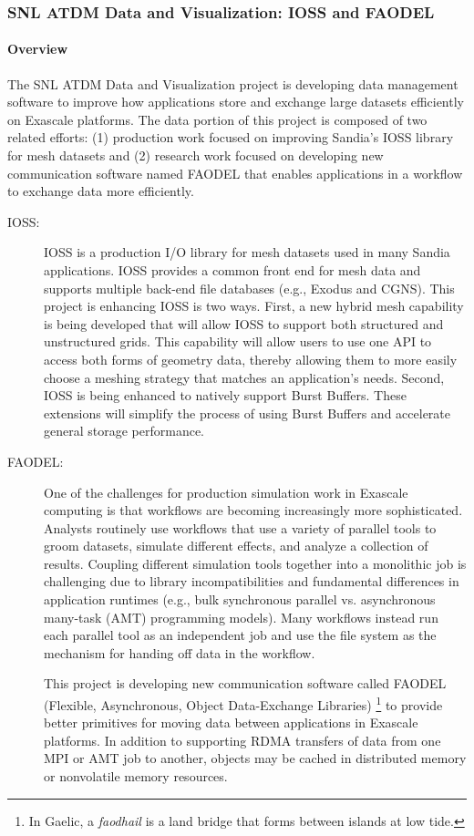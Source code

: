 \subsubsection{ SNL ATDM Data and Visualization: IOSS and FAODEL} 

\paragraph{Overview} 
The SNL ATDM Data and Visualization project is developing data management software to improve how applications store and exchange large datasets efficiently on Exascale platforms. The data portion of this project is composed of two related efforts: (1) production work focused on improving Sandia's IOSS library for mesh datasets and (2) research work focused on developing new communication software named FAODEL that enables applications in a workflow to exchange data more efficiently.

\begin{description}
\item[IOSS:] IOSS is a production I/O library for mesh datasets used in many Sandia applications. IOSS provides a common front end for mesh data and supports multiple back-end file databases (e.g., Exodus and CGNS). This project is enhancing IOSS is two ways. First, a new hybrid mesh capability is being developed that will allow IOSS to support both structured and unstructured grids. This capability will allow users to use one API to access both forms of geometry data, thereby allowing them to more easily choose a meshing strategy that matches an application's needs. Second, IOSS is being enhanced to natively support Burst Buffers. These extensions will simplify the process of using Burst Buffers and accelerate general storage performance.


\item[FAODEL:] 
One of the challenges for production simulation work in Exascale computing is that workflows are becoming increasingly more sophisticated. Analysts routinely use workflows that use a variety of parallel tools to groom datasets, simulate different effects, and analyze a collection of results. Coupling different simulation tools together into a monolithic job is challenging due to library incompatibilities and fundamental differences in application runtimes (e.g., bulk synchronous parallel vs. asynchronous many-task (AMT) programming models). Many workflows instead run each parallel tool as an independent job and use the file system as the mechanism for handing off data in the workflow.

This project is developing new communication software called FAODEL (Flexible, Asynchronous, Object Data-Exchange Libraries) \footnote{In Gaelic, a \emph{faodhail} is a land bridge that forms between islands at low tide.} to provide better primitives for moving data between applications in Exascale platforms. In addition to supporting RDMA transfers of data from one MPI or AMT job to another, objects may be cached in distributed memory or nonvolatile memory resources.
\end{description}


